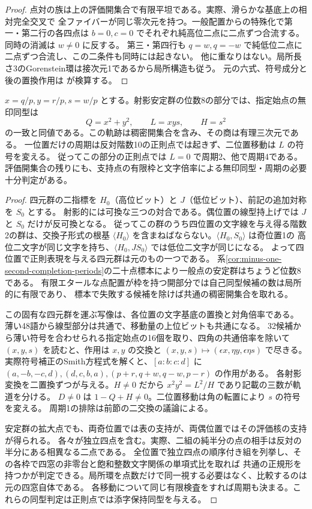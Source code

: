 \begin{proof}
点対の族は上の評価開集合で有限平坦である。実際、滑らかな基底上の相対完全交叉で
全ファイバーが同じ零次元を持つ。一般配置からの特殊化で第一・第二行の各四点は
$b=0,c=0$ でそれぞれ純高位二点に二点ずつ合流する。同時の消滅は $w\ne0$ に反する。
第三・第四行も $q=w,q=-w$ で純低位二点に二点ずつ合流し、この二条件も同時には起きない。
他に重なりはない。局所長さ3のGorenstein環は接次元1であるから局所構造も従う。
元の六式、符号成分と後の置換作用は  が検算する。
\end{proof}

\begin{theorem}\label{thm:equal-determinant-generic-quotient}
$x=q/p,y=r/p,s=w/p$ とする。射影安定群の位数8の部分では、指定始点の無印同型は
\[
    Q=x^2+y^2,\qquad L=xys,\qquad H=s^2
\]
の一致と同値である。この軌跡は稠密開集合を含み、その商は有理三次元である。
一位置だけの周期は反対階数10の正則点では起きず、二位置移動は $L$ の符号を変える。
従ってこの部分の正則点では $L=0$ で周期2、他で周期4である。
評価開集合の残りにも、支持点の有限枠と文字倍率による無印同型・周期の必要十分判定がある。
\end{theorem}
\begin{proof}
四元群の二指標を $H_0$（高位ビット）と $J$（低位ビット）、前記の追加対称を $S_0$ とする。
射影的には可換な三つの対合である。偶位置の線型持上げでは $J$ と $S_0$ だけが反可換となる。
従ってこの群のうち四位置の文字線を与え得る階数2の群は、交換子形式の根基
$\langle H_0\rangle$ を含まねばならない。$\langle H_0,S_0\rangle$ は奇位置1の
高位二文字が同じ文字を持ち、$\langle H_0,JS_0\rangle$ では低位二文字が同じになる。
よって四位置で正則表現を与える四元群は元のもの一つである。
系\ref{cor:minus-one-second-completion-periods}の二十点標本により一般点の安定群はちょうど位数8である。
有限エタールな点配置が枠を持つ開部分では自己同型候補の数は局所的に有限であり、
標本で失敗する候補を除けば共通の稠密開集合を取れる。

この固有な四元群を運ぶ写像は、各位置の文字基底の置換と対角倍率である。
薄い48語から線型部分は共通で、移動量の上位ビットも共通になる。
32候補から薄い符号を合わせられる指定始点の16個を取り、四角の共通倍率を除いて
$(x,y,s)$ を読むと、作用は $x,y$ の交換と
$(x,y,s)\mapsto(\epsilon x,\eta y,\epsilon\eta s)$ で尽きる。
実際符号補正のSmith方程式を解くと、$[a:b:c:d]$ に
$(a,-b,-c,d),(d,c,b,a),(p+r,q+w,q-w,p-r)$ の作用がある。
各射影変換を二置換ずつが与える。$H\ne0$ だから $x^2y^2=L^2/H$ であり記載の三数が軌道を分ける。
$D\ne0$ は $1-Q+H\ne0$。二位置移動は角の転置により $s$ の符号を変える。
周期1の排除は前節の二交換の議論による。

安定群の拡大点でも、両奇位置では表の支持が、両偶位置ではその評価核の支持が得られる。
各々が独立四点を含む。実際、二組の純半分の点の相手は反対の半分にある相異なる二点である。
全位置で独立四点の順序付き組を列挙し、その各枠で四窓の非零台と飽和整数文字関係の単項式比を取れば
共通の正規形を持つかが判定できる。局所環を点数だけで同一視する必要はなく、比較するのは元の四窓自体である。
各移動について同じ有限検査をすれば周期も決まる。これらの同型判定は正則点では添字保持同型を与える。
\end{proof}
